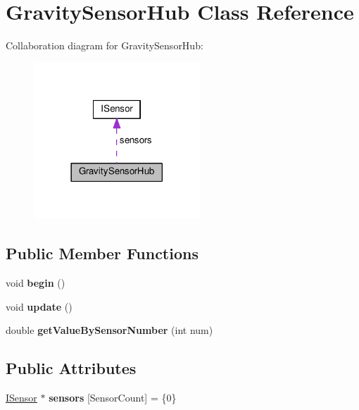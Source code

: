 \hypertarget{class_gravity_sensor_hub}{}\section{Gravity\+Sensor\+Hub Class Reference}
\label{class_gravity_sensor_hub}


Collaboration diagram for Gravity\+Sensor\+Hub\+:\nopagebreak
\begin{figure}[H]
\begin{center}
\leavevmode
\includegraphics[width=177pt]{class_gravity_sensor_hub__coll__graph}
\end{center}
\end{figure}
\subsection*{Public Member Functions}
\begin{DoxyCompactItemize}
\item 
void {\bfseries begin} ()\hypertarget{class_gravity_sensor_hub_ad6e158e956ebaea865c5508b2f0fbacc}{}\label{class_gravity_sensor_hub_ad6e158e956ebaea865c5508b2f0fbacc}

\item 
void {\bfseries update} ()\hypertarget{class_gravity_sensor_hub_a5b253e5452c4860926b694922fc987f7}{}\label{class_gravity_sensor_hub_a5b253e5452c4860926b694922fc987f7}

\item 
double {\bfseries get\+Value\+By\+Sensor\+Number} (int num)\hypertarget{class_gravity_sensor_hub_a12fdc4fb6e3ec36d16fd92ae448ccc5d}{}\label{class_gravity_sensor_hub_a12fdc4fb6e3ec36d16fd92ae448ccc5d}

\end{DoxyCompactItemize}
\subsection*{Public Attributes}
\begin{DoxyCompactItemize}
\item 
\hyperlink{class_i_sensor}{I\+Sensor} $\ast$ {\bfseries sensors} \mbox{[}Sensor\+Count\mbox{]} = \{0\}\hypertarget{class_gravity_sensor_hub_ae7bd459a1ca0eb6b2ac748f7c288a7d0}{}\label{class_gravity_sensor_hub_ae7bd459a1ca0eb6b2ac748f7c288a7d0}

\end{DoxyCompactItemize}
